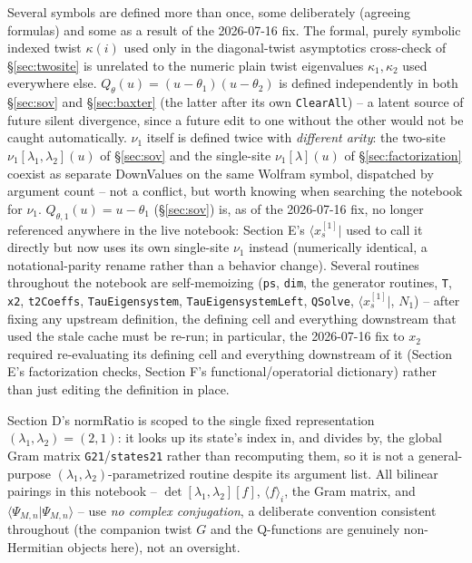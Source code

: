 \documentclass[11pt]{article}
\newcommand{\qth}{Q_\theta}
\newcommand{\qthone}{Q_{\theta,1}}
\begin{document}
Several symbols are defined more than once, some deliberately (agreeing formulas) and some as a
result of the 2026-07-16 fix. The formal, purely symbolic indexed twist $\kappa(i)$ used only in the
diagonal-twist asymptotics cross-check of \S\ref{sec:twosite} is unrelated to the numeric plain
twist eigenvalues $\kappa_1,\kappa_2$ used everywhere else. $\qth(u)=(u-\theta_1)(u-\theta_2)$ is
defined independently in both \S\ref{sec:sov} and \S\ref{sec:baxter} (the latter after its own
\texttt{ClearAll}) -- a latent source of future silent divergence, since a future edit to one
without the other would not be caught automatically. $\nu_1$ itself is defined twice with
\emph{different arity}: the two-site $\nu_1[\lambda_1,\lambda_2](u)$ of \S\ref{sec:sov} and the
single-site $\nu_1[\lambda](u)$ of \S\ref{sec:factorization} coexist as separate DownValues on the
same Wolfram symbol, dispatched by argument count -- not a conflict, but worth knowing when
searching the notebook for $\nu_1$. $\qthone(u)=u-\theta_1$ (\S\ref{sec:sov}) is, as of the
2026-07-16 fix, no longer referenced anywhere in the live notebook: Section E's $\langle x^{[1]}_s|$
used to call it directly but now uses its own single-site $\nu_1$ instead (numerically identical, a
notational-parity rename rather than a behavior change). Several routines throughout the notebook
are self-memoizing (\texttt{ps}, \texttt{dim}, the generator routines, \texttt{T}, \texttt{x2},
\texttt{t2Coeffs}, \texttt{TauEigensystem}, \texttt{TauEigensystemLeft}, \texttt{QSolve},
$\langle x^{[1]}_s|$, $N_1$) -- after fixing any upstream definition, the defining cell and
everything downstream that used the stale cache must be re-run; in particular, the 2026-07-16 fix
to $x_2$ required re-evaluating its defining cell and everything downstream of it (Section E's
factorization checks, Section F's functional/operatorial dictionary) rather than just editing the
definition in place.

Section D's $\mathrm{normRatio}$ is scoped to the single fixed representation
$(\lambda_1,\lambda_2)=(2,1)$: it looks up its state's index in, and divides by, the global Gram
matrix \texttt{G21}/\texttt{states21} rather than recomputing them, so it is not a general-purpose
$(\lambda_1,\lambda_2)$-parametrized routine despite its argument list. All bilinear pairings in
this notebook -- $\det[\lambda_1,\lambda_2][f]$, $\langle f\rangle_i$, the Gram matrix, and
$\langle\Psi_{M,n}|\Psi_{M,n}\rangle$ -- use \emph{no complex conjugation}, a deliberate convention
consistent throughout (the companion twist $G$ and the Q-functions are genuinely non-Hermitian
objects here), not an oversight.
\end{document}
